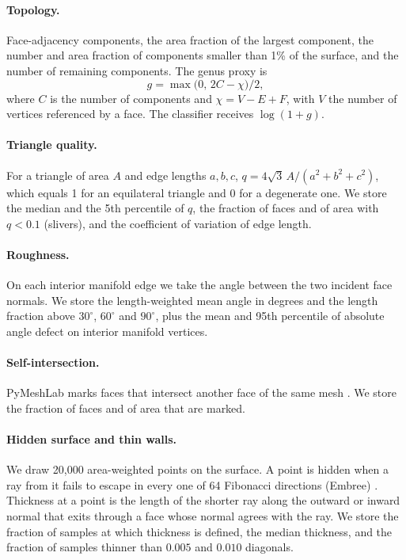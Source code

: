 \paragraph{Topology.}
Face-adjacency components, the area fraction of the largest component, the number and area fraction of components smaller than 1\% of the surface, and the number of remaining components.
The genus proxy is
\begin{equation}
g = \max\bigl(0,\, 2C - \chi\bigr) / 2,
\label{eq:genus}
\end{equation}
where \(C\) is the number of components and \(\chi = V - E + F\), with \(V\) the number of vertices referenced by a face.
The classifier receives \(\log(1+g)\).

\paragraph{Triangle quality.}
For a triangle of area \(A\) and edge lengths \(a,b,c\),
\(q = 4\sqrt{3}\, A / (a^2+b^2+c^2)\), which equals 1 for an equilateral triangle and 0 for a degenerate one.
We store the median and the 5th percentile of \(q\), the fraction of faces and of area with \(q < 0.1\) (slivers), and the coefficient of variation of edge length.

\paragraph{Roughness.}
On each interior manifold edge we take the angle between the two incident face normals.
We store the length-weighted mean angle in degrees and the length fraction above \(30^\circ\), \(60^\circ\) and \(90^\circ\), plus the mean and 95th percentile of absolute angle defect on interior manifold vertices.

\paragraph{Self-intersection.}
PyMeshLab marks faces that intersect another face of the same mesh \citep{cignoni2008meshlab}.
We store the fraction of faces and of area that are marked.

\paragraph{Hidden surface and thin walls.}
We draw 20{,}000 area-weighted points on the surface.
A point is hidden when a ray from it fails to escape in every one of 64 Fibonacci directions (Embree) \citep{wald2014embree}.
Thickness at a point is the length of the shorter ray along the outward or inward normal that exits through a face whose normal agrees with the ray.
We store the fraction of samples at which thickness is defined, the median thickness, and the fraction of samples thinner than \(0.005\) and \(0.010\) diagonals.

